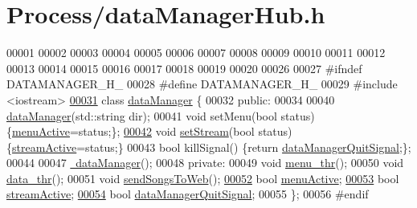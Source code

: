 \hypertarget{dataManagerHub_8h_source}{\section{\-Process/data\-Manager\-Hub.h}
}

\begin{DoxyCode}
00001 
00002 
00003 
00004 
00005 
00006 
00007 
00008 
00009 
00010 
00011 
00012 
00013 
00014 
00015 
00016 
00017 
00018 
00019 
00020 
00026 
00027 \textcolor{preprocessor}{#ifndef DATAMANAGER\_H\_}
00028 \textcolor{preprocessor}{}\textcolor{preprocessor}{#define DATAMANAGER\_H\_}
00029 \textcolor{preprocessor}{}\textcolor{preprocessor}{#include <iostream>}
\hypertarget{dataManagerHub_8h_source_l00031}{}\hyperlink{classdataManager}{00031} \textcolor{keyword}{class }\hyperlink{classdataManager}{dataManager} \{
00032 \textcolor{keyword}{public}:
00034 
00040     \hyperlink{classdataManager_a53882fb8b2d08f1b73f6c8e9202c5ae4}{dataManager}(std::string dir);
00041     \textcolor{keywordtype}{void} setMenu(\textcolor{keywordtype}{bool} status) \{\hyperlink{classdataManager_a7126a92f131b786ecf68b7a27d58d814}{menuActive}=status;\}; 
\hypertarget{dataManagerHub_8h_source_l00042}{}\hyperlink{classdataManager_a454263e6cf2ca50cc53afc8bae0e0e58}{00042}     \textcolor{keywordtype}{void} \hyperlink{classdataManager_a454263e6cf2ca50cc53afc8bae0e0e58}{setStream}(\textcolor{keywordtype}{bool} status) \{\hyperlink{classdataManager_a73070a3be96596028b91542367e1ebdd}{streamActive}=status;\} 
00043     \textcolor{keywordtype}{bool} killSignal() \{\textcolor{keywordflow}{return} \hyperlink{classdataManager_a76b9dba2dde86540f5f37f3b5840653e}{dataManagerQuitSignal};\}; 
00044 
00047     \hyperlink{classdataManager_ac9e28e6a50c6ad489ca7376b89cc20cb}{~dataManager}();
00048 \textcolor{keyword}{private}:
00049     \textcolor{keywordtype}{void} \hyperlink{classdataManager_a7ba580547b0d0dbe516b8e694e9f51b2}{menu_thr}(); 
00050     \textcolor{keywordtype}{void} \hyperlink{classdataManager_a509a1915ab57d91969f4d7075a138c2e}{data_thr}(); 
00051     \textcolor{keywordtype}{void} \hyperlink{classdataManager_a69df5746c83be0abbb051ba4bd4d96d6}{sendSongsToWeb}(); 
\hypertarget{dataManagerHub_8h_source_l00052}{}\hyperlink{classdataManager_a7126a92f131b786ecf68b7a27d58d814}{00052}     \textcolor{keywordtype}{bool} \hyperlink{classdataManager_a7126a92f131b786ecf68b7a27d58d814}{menuActive}; 
\hypertarget{dataManagerHub_8h_source_l00053}{}\hyperlink{classdataManager_a73070a3be96596028b91542367e1ebdd}{00053}     \textcolor{keywordtype}{bool} \hyperlink{classdataManager_a73070a3be96596028b91542367e1ebdd}{streamActive}; 
\hypertarget{dataManagerHub_8h_source_l00054}{}\hyperlink{classdataManager_a76b9dba2dde86540f5f37f3b5840653e}{00054}     \textcolor{keywordtype}{bool} \hyperlink{classdataManager_a76b9dba2dde86540f5f37f3b5840653e}{dataManagerQuitSignal};
00055 \};
00056 \textcolor{preprocessor}{#endif}
\end{DoxyCode}
